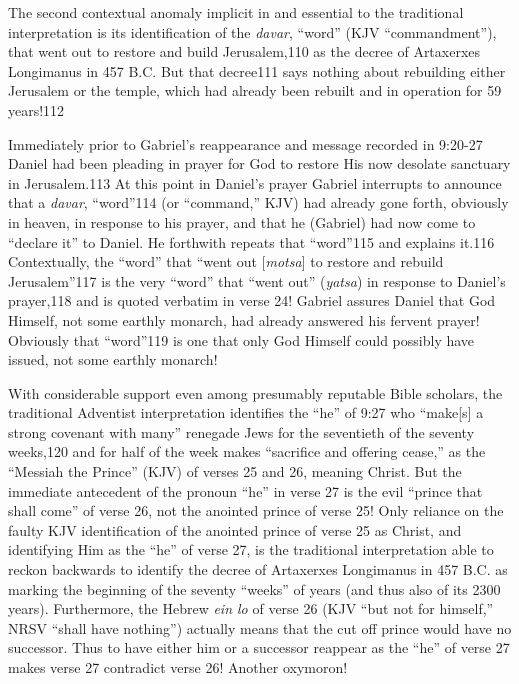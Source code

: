 The second contextual anomaly implicit in and essential to the traditional
interpretation is its identification of the \textit{davar}, ``word'' (KJV
``commandment''), that went out to restore and build Jerusalem,110 as the
decree of Artaxerxes Longimanus in 457 B.C. But that decree111 says nothing
about rebuilding either Jerusalem or the temple, which had already been
rebuilt and in operation for 59 years!112

Immediately prior to Gabriel's reappearance and message recorded in 9:20-27
Daniel had been pleading in prayer for God to restore His now desolate
sanctuary in Jerusalem.113 At this point in Daniel's prayer Gabriel
interrupts to announce that a \textit{davar}, ``word''114 (or ``command,'' KJV) had
already gone forth, obviously in heaven, in response to his prayer, and that
he (Gabriel) had now come to ``declare it'' to Daniel. He forthwith repeats
that ``word''115 and explains it.116 Contextually, the ``word'' that ``went out
[\textit{motsa}] to restore and rebuild Jerusalem''117 is the very ``word'' that ``went
out'' (\textit{yatsa}) in response to Daniel's prayer,118 and is quoted verbatim in
verse 24! Gabriel assures Daniel that God Himself, not some earthly monarch,
had already answered his fervent prayer! Obviously that ``word''119 is one
that only God Himself could possibly have issued, not some earthly monarch!

With considerable support even among presumably reputable Bible scholars,
the traditional Adventist interpretation identifies the ``he'' of 9:27 who
``make[s] a strong covenant with many'' renegade Jews for the seventieth of 
the seventy weeks,120 and for half of the week makes ``sacrifice and
offering cease,'' as the ``Messiah the Prince'' (KJV) of verses 25 and 26,
meaning Christ. But the immediate antecedent of the pronoun ``he'' in verse 27
is the evil ``prince that shall come'' of verse 26, not the anointed prince of
verse 25! Only reliance on the faulty KJV identification of the anointed
prince of verse 25 as Christ, and identifying Him as the ``he'' of verse 27,
is the traditional interpretation able to reckon backwards to identify the
decree of Artaxerxes Longimanus in 457 B.C. as marking the beginning of the
seventy ``weeks'' of years (and thus also of its 2300 years). Furthermore, the
Hebrew \textit{ein lo} of verse 26 (KJV ``but not for himself,'' NRSV ``shall have
nothing'') actually means that the cut off prince would have no successor.
Thus to have either him or a successor reappear as the ``he'' of verse 27
makes verse 27 contradict verse 26! Another oxymoron!

